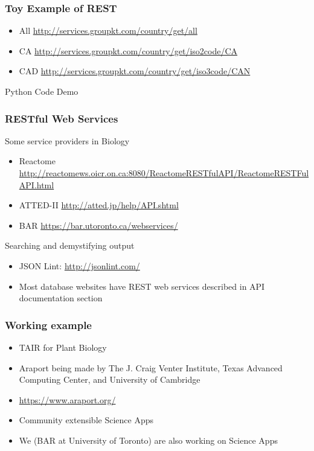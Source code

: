 \documentclass{beamer}
\begin{document}
	\begin{frame}
		\frametitle{Toy Example of REST}
		\begin{itemize}
			\item All \url{http://services.groupkt.com/country/get/all}
			\item CA \url{http://services.groupkt.com/country/get/iso2code/CA}
			\item CAD \url{http://services.groupkt.com/country/get/iso3code/CAN}
		\end{itemize}
		Python Code Demo
	\end{frame}

	\begin{frame}
		\frametitle{RESTful Web Services}
		Some service providers in Biology
		\begin{itemize}
			\item Reactome \url{http://reactomews.oicr.on.ca:8080/ReactomeRESTfulAPI/ReactomeRESTFulAPI.html}
			\item ATTED-II \url{http://atted.jp/help/API.shtml}
			\item BAR \url{https://bar.utoronto.ca/webservices/}
		\end{itemize}
		Searching and demystifying output
		\begin{itemize}
			\item JSON Lint: \url{http://jsonlint.com/}
			\item Most database websites have REST web services described in API documentation section
		\end{itemize}
	\end{frame}

	\begin{frame}
		\frametitle{Working example}
		\begin{itemize}
			\item TAIR for Plant Biology 
			\item Araport being made by The J. Craig Venter Institute, Texas Advanced Computing Center, and University of Cambridge
			\item \url{https://www.araport.org/}
			\item Community extensible Science Apps
			\item We (BAR at University of Toronto) are also working on Science Apps
		\end{itemize}
	\end{frame}
\end{document}
